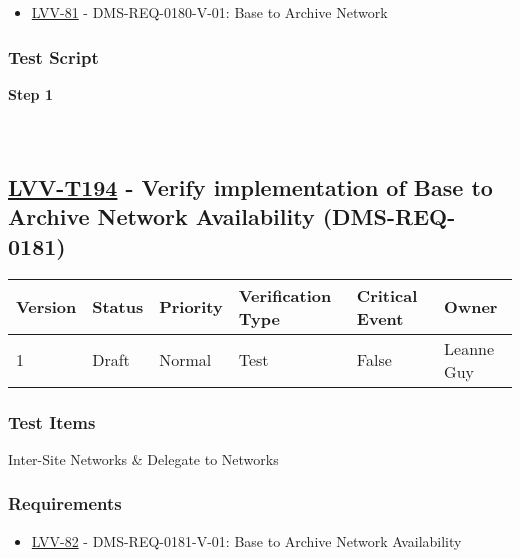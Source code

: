 \begin{itemize}
\tightlist
\item
  \href{https://jira.lsstcorp.org/browse/LVV-81}{LVV-81} -
  DMS-REQ-0180-V-01: Base to Archive Network
\end{itemize}

\hypertarget{test-script-93}{%
\subsubsection{Test Script}\label{test-script-93}}

\textbf{Step 1}\\
~\\
~\\

\hypertarget{lvv-t194---verify-implementation-of-base-to-archive-network-availability-dms-req-0181}{%
\subsection{\texorpdfstring{\href{https://jira.lsstcorp.org/secure/Tests.jspa\#/testCase/LVV-T194}{LVV-T194}
- Verify implementation of Base to Archive Network Availability
(DMS-REQ-0181)}{LVV-T194 - Verify implementation of Base to Archive Network Availability (DMS-REQ-0181)}}\label{lvv-t194---verify-implementation-of-base-to-archive-network-availability-dms-req-0181}}

\begin{longtable}[]{@{}llllll@{}}
\toprule
Version & Status & Priority & Verification Type & Critical Event &
Owner\tabularnewline
\midrule
\endhead
1 & Draft & Normal & Test & False & Leanne Guy\tabularnewline
\bottomrule
\end{longtable}

\hypertarget{test-items-94}{%
\subsubsection{Test Items}\label{test-items-94}}

Inter-Site Networks \& Delegate to Networks

\hypertarget{requirements-94}{%
\subsubsection{Requirements}\label{requirements-94}}

\begin{itemize}
\tightlist
\item
  \href{https://jira.lsstcorp.org/browse/LVV-82}{LVV-82} -
  DMS-REQ-0181-V-01: Base to Archive Network Availability
\end{itemize}

